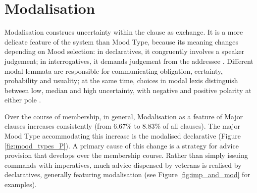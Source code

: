 \section{Modalisation} \label{sect:modalisation}

Modalisation construes uncertainty within the clause as exchange. It is a more delicate feature of the  system than Mood Type, because its meaning changes depending on Mood selection: in declaratives, it congruently involves a speaker judgement; in interrogatives, it demands judgement from the addressee \cite{halliday_introduction_2004}. Different modal lemmata are responsible for communicating obligation, certainty, probability and usuality; at the same time, choices in modal lexis distinguish between low, median and high uncertainty, with negative and positive polarity at either pole \cite[see][\slash Section \ref{sect:mood-grammar}: ]{eggins_introduction_2004}.

%
Over the course of membership, in general, Modalisation as a feature of Major clauses increases consistently (from 6.67\% to 8.83\% of all clauses). The major Mood Type accommodating this increase is the modalised declarative (Figure \ref{fig:mood_types_P}). A primary cause of this change is a strategy for advice provision that develops over the membership course. Rather than simply issuing commands with imperatives, much advice dispensed by veterans is realised by declaratives, generally featuring modalisation (see Figure \ref{fig:imp_and_mod} for examples). 

